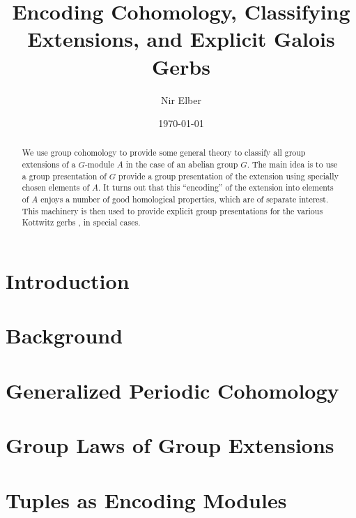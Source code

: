 \documentclass{article}
\title{Encoding Cohomology, Classifying Extensions, and Explicit Galois Gerbs}
\author{Nir Elber}
\date{\today}
\numberwithin{equation}{section}
\begin{document}
\maketitle

\begin{abstract}
	\noindent We use group cohomology to provide some general theory to classify all group extensions of a $ G$-module $A$ in the case of an abelian group $ G$. The main idea is to use a group presentation of $G$ provide a group presentation of the extension using specially chosen elements of $A$. It turns out that this ``encoding'' of the extension into elements of $A$ enjoys a number of good homological properties, which are of separate interest. This machinery is then used to provide explicit group presentations for the various Kottwitz gerbs \cite{kottwitz}, in special cases.
\end{abstract}

\setcounter{tocdepth}{4}
\tableofcontents

\section{Introduction} \label{sec:intro}


\section{Background} \label{sec:background}


\section{Generalized Periodic Cohomology} \label{sec:crackpot}


\section{Group Laws of Group Extensions} \label{sec:general}




\section{Tuples as Encoding Modules} \label{sec:tuplestudy}

\end{document}

